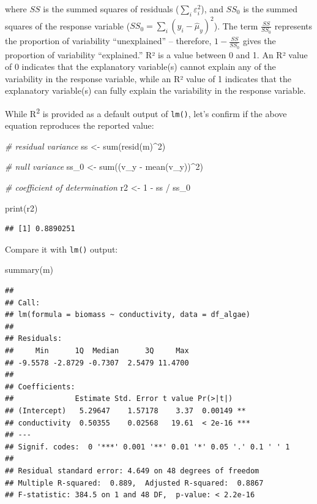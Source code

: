 \documentclass[
]{article}
\newenvironment{Shaded}{\begin{snugshade}}{\end{snugshade}}
\newcommand{\CommentTok}[1]{\textcolor[rgb]{0.56,0.35,0.01}{\textit{#1}}}
\newcommand{\DecValTok}[1]{\textcolor[rgb]{0.00,0.00,0.81}{#1}}
\newcommand{\FunctionTok}[1]{\textcolor[rgb]{0.00,0.00,0.00}{#1}}
\newcommand{\NormalTok}[1]{#1}
\newcommand{\OtherTok}[1]{\textcolor[rgb]{0.56,0.35,0.01}{#1}}
\newcommand{\SpecialCharTok}[1]{\textcolor[rgb]{0.00,0.00,0.00}{#1}}
\begin{document}
where \(SS\) is the summed squares of residuals (\(\sum_i \varepsilon_i^2\)), and \(SS_0\) is the summed squares of the response variable (\(SS_0 = \sum_i(y_i - \hat{\mu}_y)^2\)). The term \(\frac{SS}{SS_0}\) represents the proportion of variability ``unexplained'' -- therefore, \(1 - \frac{SS}{SS_0}\) gives the proportion of variability ``explained.'' R² is a value between 0 and 1. An R² value of 0 indicates that the explanatory variable(s) cannot explain any of the variability in the response variable, while an R² value of 1 indicates that the explanatory variable(s) can fully explain the variability in the response variable.

While R\textsuperscript{2} is provided as a default output of \texttt{lm()}, let's confirm if the above equation reproduces the reported value:

\begin{Shaded}
\begin{Highlighting}[]
\CommentTok{\# residual variance}
\NormalTok{ss }\OtherTok{\textless{}{-}} \FunctionTok{sum}\NormalTok{(}\FunctionTok{resid}\NormalTok{(m)}\SpecialCharTok{\^{}}\DecValTok{2}\NormalTok{)}

\CommentTok{\# null variance}
\NormalTok{ss\_0 }\OtherTok{\textless{}{-}} \FunctionTok{sum}\NormalTok{((v\_y }\SpecialCharTok{{-}} \FunctionTok{mean}\NormalTok{(v\_y))}\SpecialCharTok{\^{}}\DecValTok{2}\NormalTok{)}

\CommentTok{\# coefficient of determination}
\NormalTok{r2 }\OtherTok{\textless{}{-}} \DecValTok{1} \SpecialCharTok{{-}}\NormalTok{ ss }\SpecialCharTok{/}\NormalTok{ ss\_0}

\FunctionTok{print}\NormalTok{(r2)}
\end{Highlighting}
\end{Shaded}

\begin{verbatim}
## [1] 0.8890251
\end{verbatim}

Compare it with \texttt{lm()} output:

\begin{Shaded}
\begin{Highlighting}[]
\FunctionTok{summary}\NormalTok{(m)}
\end{Highlighting}
\end{Shaded}

\begin{verbatim}
## 
## Call:
## lm(formula = biomass ~ conductivity, data = df_algae)
## 
## Residuals:
##     Min      1Q  Median      3Q     Max 
## -9.5578 -2.8729 -0.7307  2.5479 11.4700 
## 
## Coefficients:
##              Estimate Std. Error t value Pr(>|t|)    
## (Intercept)   5.29647    1.57178    3.37  0.00149 ** 
## conductivity  0.50355    0.02568   19.61  < 2e-16 ***
## ---
## Signif. codes:  0 '***' 0.001 '**' 0.01 '*' 0.05 '.' 0.1 ' ' 1
## 
## Residual standard error: 4.649 on 48 degrees of freedom
## Multiple R-squared:  0.889,  Adjusted R-squared:  0.8867 
## F-statistic: 384.5 on 1 and 48 DF,  p-value: < 2.2e-16
\end{verbatim}
\end{document}
